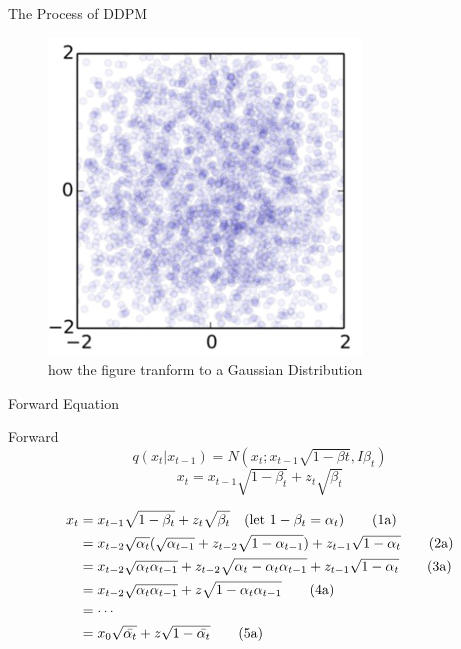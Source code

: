 \documentclass[aspectratio=169]{beamer}
\begin{document}
\begin{frame}{The Process of DDPM}
\begin{figure}[htbp]
{\begin{minipage}[b]{.3\linewidth}
                \centering
                \includegraphics[scale=0.5]{../pic/3.png}
            \end{minipage}
        }
        \caption{how the figure tranform to a Gaussian Distribution}
    \end{figure}
\end{frame}

\begin{frame}{Forward Equation}
    \begin{block}{Forward}
        \begin{equation}
            q(x_t|x_{t-1}) = N(x_t;x_{t-1}\sqrt{1-\beta t}, I\beta_t)
        \end{equation}
        \begin{equation}
            x_t = x_{t-1} \sqrt{1-\beta_t} +  z_t\sqrt{\beta_t}
        \end{equation}
    \end{block}
    \begin{block}{}
        \begin{align*}
            x_t & = x_{t-1} \sqrt{1-\beta_t}+ z_t\sqrt{\beta_t} \ \ \ ({\rm let\ } 1-\beta_t = \alpha_t) \tag{1a}                              \\
                & = x_{t-2} \sqrt{\alpha_t}(\sqrt{\alpha_{t-1}} + z_{t-2} \sqrt{1-\alpha_{t-1}}) + z_{t-1}\sqrt{1-\alpha_t}   \tag{2a}         \\
                & = x_{t-2} \sqrt{\alpha_t\alpha_{t-1}}  + z_{t-2} \sqrt{\alpha_t - \alpha_t\alpha_{t-1}} + z_{t-1} \sqrt{1-\alpha_t} \tag{3a} \\
                & = x_{t-2} \sqrt{\alpha_t\alpha_{t-1}} + z\sqrt{1-\alpha_t\alpha_{t-1}}                                          \tag{4a}     \\
                & = \cdots                                                                                                                     \\
                & = x_0 \sqrt{\bar{\alpha_t}} + z\sqrt{1-\bar{\alpha_t}}\tag{5a}
        \end{align*}
    \end{block}
\end{frame}
\end{document}
